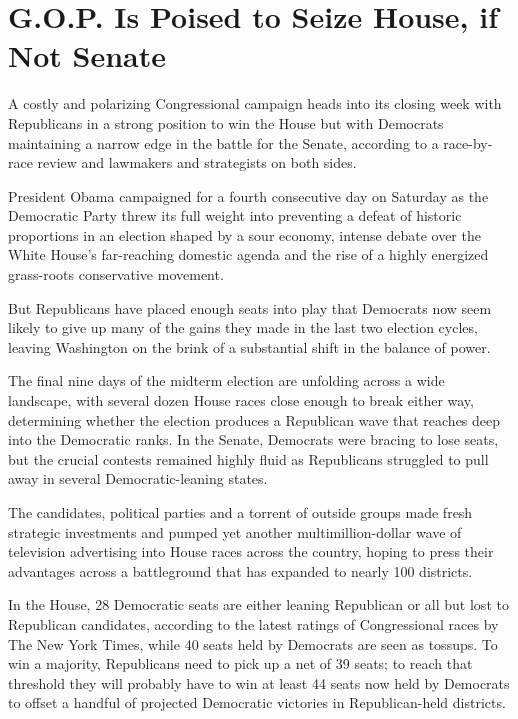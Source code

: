 ﻿\documentclass[12pt]{article}
\begin{document}
\section{G.O.P. Is Poised to Seize House, if Not Senate}

\lettrine{A}{} costly and polarizing Congressional campaign heads into its
closing week with Republicans in a strong position to win the House but with Democrats maintaining a
narrow edge in the battle for the Senate, according to a race-by-race review and lawmakers and
strategists on both sides.

President Obama campaigned for a fourth consecutive day on Saturday as the Democratic Party threw
its full weight into preventing a defeat of historic proportions in an election shaped by a sour
economy, intense debate over the White House's far-reaching domestic agenda and the rise of a highly
energized grass-roots conservative movement.

But Republicans have placed enough seats into play that Democrats now seem likely to give up many of
the gains they made in the last two election cycles, leaving Washington on the brink of a
substantial shift in the balance of power.

The final nine days of the midterm election are unfolding across a wide landscape, with several
dozen House races close enough to break either way, determining whether the election produces a
Republican wave that reaches deep into the Democratic ranks. In the Senate, Democrats were bracing
to lose seats, but the crucial contests remained highly fluid as Republicans struggled to pull away
in several Democratic-leaning states.

The candidates, political parties and a torrent of outside groups made fresh strategic investments
and pumped yet another multimillion-dollar wave of television advertising into House races across
the country, hoping to press their advantages across a battleground that has expanded to nearly 100
districts.

In the House, 28 Democratic seats are either leaning Republican or all but lost to Republican
candidates, according to the latest ratings of Congressional races by The New York Times, while 40
seats held by Democrats are seen as tossups. To win a majority, Republicans need to pick up a net of
39 seats; to reach that threshold they will probably have to win at least 44 seats now held by
Democrats to offset a handful of projected Democratic victories in Republican-held districts.
\end{document}
